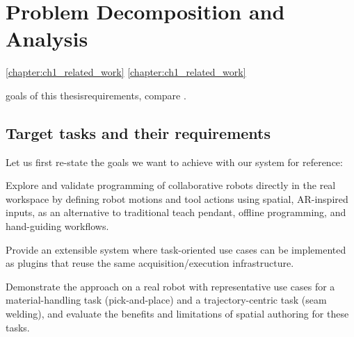 \chapter{Problem Decomposition and Analysis} \label{chapter:ch2_analysis}

\DIFdelbegin {}\DIFdelend \DIFaddbegin {}\autoref{chapter:ch1_related_work} \autoref{chapter:ch1_related_work}

\DIFaddend goals of this thesis\DIFdelbegin {}\DIFdelend \DIFaddbegin {}\DIFaddend requirements, compare \DIFdelbegin {}\DIFdelend \DIFaddbegin {}\DIFaddend .

\section{Target tasks and their requirements} \label{sec:ch2_analysis_tasks_and_requirements}

Let us first re-state the goals we want to achieve with our system for reference:
\begin{goals}
  \item \label{an_goal:1} Explore and validate programming of collaborative robots directly in the real workspace by defining robot motions and tool actions using spatial, AR-inspired inputs, as an alternative to traditional teach pendant, offline programming, and hand-guiding workflows.
  \item \label{an_goal:2} Provide an extensible system where task-oriented use cases can be implemented as plugins that reuse the same acquisition/execution infrastructure.
  \item \label{an_goal:3} Demonstrate the approach on a real robot with representative use cases for a material-handling task (pick-and-place) and a trajectory-centric task (seam welding), and evaluate the benefits and limitations of spatial authoring for these tasks.
\end{goals}

